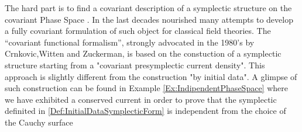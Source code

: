 \documentclass[Main]{subfiles}
\begin{document}
		The hard part is to find a covariant description of a symplectic structure on the covariant Phase Space .
		In the last decades nourished many attempts to develop a fully covariant formulation of such object for classical field theories.
		The “covariant functional formalism”, strongly advocated in the 1980’s by Crnkovic,Witten and Zuckerman,
		is based on the constuction of a symplectic structure starting from a "covariant presymplectic current density"\cite{Crnkovic1999}\cite{Khavkine2014}.
		This approach is slightly different from the construction "by initial data". A glimpse of such construction can be found in Example \ref{Ex:IndipendentPhaseSpace} where we have exhibited a conserved current in order to prove that the symplectic definited in \ref{Def:InitialDataSymplecticForm} is independent from the choice of the Cauchy surface
\end{document}

